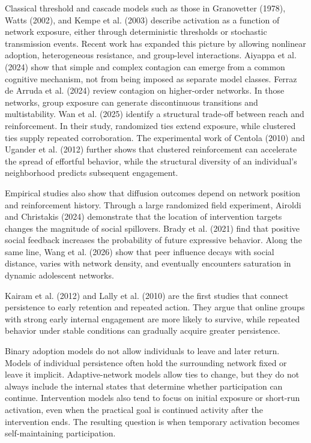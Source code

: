 \documentclass[11pt]{article}
\begin{document}
Classical threshold and cascade models such as those in Granovetter (1978), Watts (2002), and Kempe et al. (2003) describe activation as a function of network exposure, either through deterministic thresholds or stochastic transmission events. Recent work has expanded this picture by allowing nonlinear adoption, heterogeneous resistance, and group-level interactions. Aiyappa et al. (2024) show that simple and complex contagion can emerge from a common cognitive mechanism, not from being imposed as separate model classes. Ferraz de Arruda et al. (2024) review contagion on higher-order networks. In those networks, group exposure can generate discontinuous transitions and multistability. Wan et al. (2025) identify a structural trade-off between reach and reinforcement. In their study, randomized ties extend exposure, while clustered ties supply repeated corroboration. The experimental work of Centola (2010) and Ugander et al. (2012) further shows that clustered reinforcement can accelerate the spread of effortful behavior, while the structural diversity of an individual’s neighborhood predicts subsequent engagement.

Empirical studies also show that diffusion outcomes depend on network position and reinforcement history. Through a large randomized field experiment, Airoldi and Christakis (2024) demonstrate that the location of intervention targets changes the magnitude of social spillovers. Brady et al. (2021) find that positive social feedback increases the probability of future expressive behavior. Along the same line, Wang et al. (2026) show that peer influence decays with social distance, varies with network density, and eventually encounters saturation in dynamic adolescent networks. 

Kairam et al. (2012) and Lally et al. (2010) are the first studies that connect persistence to early retention and repeated action. They argue that online groups with strong early internal engagement are more likely to survive, while repeated behavior under stable conditions can gradually acquire greater persistence. 

Binary adoption models do not allow individuals to leave and later return. Models of individual persistence often hold the surrounding network fixed or leave it implicit. Adaptive-network models allow ties to change, but they do not always include the internal states that determine whether participation can continue. Intervention models also tend to focus on initial exposure or short-run activation, even when the practical goal is continued activity after the intervention ends. The resulting question is when temporary activation becomes self-maintaining participation. 
\end{document}
